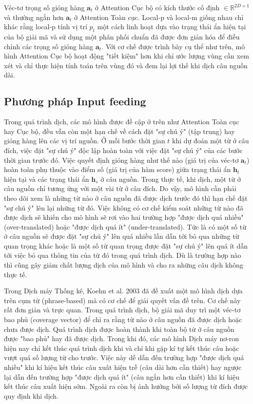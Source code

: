 Véc-tơ trọng số gióng hàng $\bm{a}_t$ ở Attention Cục bộ có kích thước cố định $\in \mathbb{R}^{2D + 1}$ và thường ngắn hơn $\bm{a}_t$ ở Attention Toàn cục. Local-p và local-m giống nhau chỉ khác rằng local-p tính vị trí $p_t$ một cách linh hoạt dựa vào trạng thái ẩn hiện tại của bộ giải mã và sử dụng một phân phối chuẩn đã được đơn giản hóa để điều chỉnh các trọng số gióng hàng $\bm{a}_t$. 
Với cơ chế được trình bày cụ thể như trên, mô hình Attention Cục bộ hoạt động "tiết kiệm" hơn khi chỉ ước lượng vùng cần xem xét và chỉ thực hiện tính toán trên vùng đó và đem lại lợi thế khi dịch câu nguồn dài.

\subsection{Phương pháp Input feeding}
Trong quá trình dịch, các mô hình được đề cập ở trên như Attention Toàn cục hay Cục bộ, đều vẫn còn một hạn chế về cách đặt "sự chú ý" (tập trung) hay gióng hàng lên các vị trí nguồn. Ở mỗi bước thời gian $t$ khi dự đoán một từ ở câu đích, việc đặt "sự chú ý" độc lập hoàn toàn với việc đặt "sự chú ý" của các bước thời gian trước đó. Việc quyết định gióng hàng như thế nào (giá trị của véc-tơ $\bm{a}_t$) hoàn toàn phụ thuộc vào điểm số (giá trị của hàm score) giữa trạng thái ẩn $\bm{h}_t$ hiện tại và các trạng thái ẩn $\bm{h}_s$ ở câu nguồn. Trong thực tế, khi dịch, một từ ở câu nguồn chỉ tương ứng với một vài từ ở câu đích. Do vậy, mô hình cần phải theo dõi xem là những từ nào ở câu nguồn đã được dịch trước đó thì hạn chế đặt "sự chú ý" lên lại những từ đó. Việc không có cơ chế kiểm soát những từ nào đã được dịch sẽ khiến cho mô hình sẽ rơi vào hai trường hợp "được dịch quá nhiều" (over-translated) hoặc "được dịch quá ít" (under-translated). Tức là có một số từ ở câu nguồn sẽ được đặt "sự chú ý" lên quá nhiều lần dẫn tới bỏ qua những từ quan trọng khác hoặc là một số từ quan trọng được đặt "sự chú ý" lên quá ít dẫn tới việc bỏ qua thông tin của từ đó trong quá trình dịch. Dù là trường hợp nào thì cũng gây giảm chất lượng dịch của mô hình và cho ra những câu dịch không thực tế.

Trong Dịch máy Thống kê, Koehn et al. 2003 \cite{smtKoehn2003} đã đề xuất một mô hình dịch dựa trên cụm từ (phrase-based) mà có cơ chế để giải quyết vấn đề trên. Cơ chế này rất đơn giản và trực quan. Trong quá trình dịch, bộ giải mã duy trì một véc-tơ bao phủ (coverage vector) để chỉ ra rằng từ nào ở câu nguồn đã được dịch hoặc chưa được dịch. Quá trình dịch được hoàn thành khi toàn bộ từ ở câu nguồn được "bao phủ" hay đã được dịch. Trong khi đó, các mô hình Dịch máy nơ-ron hiện nay chỉ kết thúc quá trình dịch khi và chỉ khi gặp kí tự kết thúc câu hoặc vượt quá số lượng từ cho trước. Việc này dễ dẫn đến trường hợp "được dịch quá nhiều" khi kí hiệu kết thúc câu xuất hiện trễ (câu dài hơn cần thiết) hay ngược lại dẫn đến trường hợp "được dịch quá ít" (câu ngắn hơn cần thiết) khi kí hiệu kết thúc câu xuất hiện sớm. Ngoài ra còn bị ảnh hưởng bởi số lượng từ đích được quy định khi dịch.

